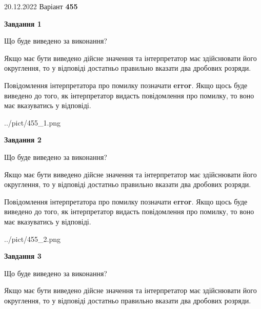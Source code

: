 \documentclass[12pt, ukrainian]{article}
\begin{document}
{20.12.2022 Варіант \No \textbf { 455 }\par}
{
\begin {Large}

{\begin {center}\textbf{Завдання 1}\end {center}}\par
Що буде виведено за виконання? \par

Якщо має бути виведено дійсне значення та інтерпретатор має здійснювати його округлення, 
то у відповіді достатньо правильно вказати два дробових розряди.

Повідомлення інтерпретатора про помилку позначати \textbf{error}.
Якщо щось буде виведено до того, як інтерпретатор видасть повідомлення про помилку, 
то воно має вказуватись у відповіді. \par

\begin{center}
	{../pict/455_1.png}
\end{center}
\newpage

{\begin {center}\textbf{Завдання 2}\end {center}}\par
Що буде виведено за виконання? \par

Якщо має бути виведено дійсне значення та інтерпретатор має здійснювати його округлення, 
то у відповіді достатньо правильно вказати два дробових розряди.

Повідомлення інтерпретатора про помилку позначати \textbf{error}.
Якщо щось буде виведено до того, як інтерпретатор видасть повідомлення про помилку, 
то воно має вказуватись у відповіді. \par

\begin{center}
	{../pict/455_2.png}
\end{center}
\newpage

{\begin {center}\textbf{Завдання 3}\end {center}}\par
Що буде виведено за виконання? \par

Якщо має бути виведено дійсне значення та інтерпретатор має здійснювати його округлення, 
то у відповіді достатньо правильно вказати два дробових розряди.


\end{Large}}
\end{document}
